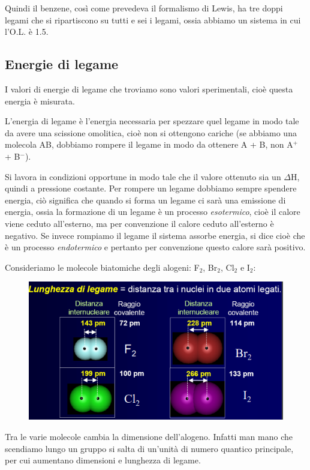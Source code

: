 Quindi il benzene, così come prevedeva il formalismo di Lewis, ha tre doppi legami che si ripartiscono su tutti e sei i legami, ossia abbiamo un sistema in cui l'O.L. è 1.5.
\subsection{Energie di legame}
I valori di energie di legame che troviamo sono valori sperimentali, cioè questa energia è misurata.

L'energia di legame è l'energia necessaria per spezzare quel legame in modo tale da avere una scissione omolitica, cioè non si ottengono cariche (se abbiamo una molecola AB, dobbiamo rompere il legame in modo da ottenere A + B, non A$^+$ + B$^-$).

Si lavora in condizioni opportune in modo tale che il valore ottenuto sia un $\Delta$H, quindi a pressione costante. Per rompere un legame dobbiamo sempre spendere energia, ciò significa  che quando si forma un legame ci sarà una emissione di energia, ossia la formazione di un legame è un processo \textit{esotermico}, cioè il calore viene ceduto all'esterno, ma per convenzione il calore ceduto all'esterno è negativo. Se invece rompiamo il legame il sistema assorbe energia, si dice cioè che è un processo \textit{endotermico} e pertanto per convenzione questo calore sarà positivo.

Consideriamo le molecole biatomiche degli alogeni: F$_2$, Br$_2$, Cl$_2$ e I$_2$:

\begin{figure}[htp]
    \centering
    \includegraphics[width=12cm]{immagini/molecole_biatomiche_alogeni.png}
\end{figure}

Tra le varie molecole cambia la dimensione dell'alogeno. Infatti man mano che scendiamo lungo un gruppo si salta di un'unità di numero quantico principale, per cui aumentano dimensioni e lunghezza di legame.

